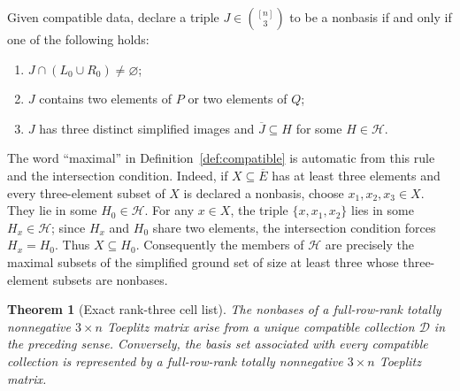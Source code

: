 \documentclass{amsart}
\numberwithin{equation}{section}
\newtheorem{theorem}{Theorem}
\theoremstyle{definition}
\theoremstyle{remark}
\begin{document}
Given compatible data, declare a triple $J\in\binom{[n]}3$ to be a nonbasis if and only if one of the following holds:
\begin{enumerate}
\item $J\cap(L_0\cup R_0)\ne\varnothing$;
\item $J$ contains two elements of $P$ or two elements of $Q$;
\item $J$ has three distinct simplified images and $\overline J\subseteq H$ for some $H\in\mathcal H$.
\end{enumerate}
The word ``maximal'' in Definition~\ref{def:compatible} is automatic from this rule and the intersection condition.  Indeed, if $X\subseteq\overline E$ has at least three elements and every three-element subset of $X$ is declared a nonbasis, choose $x_1,x_2,x_3\in X$.  They lie in some $H_0\in\mathcal H$.  For any $x\in X$, the triple $\{x,x_1,x_2\}$ lies in some $H_x\in\mathcal H$; since $H_x$ and $H_0$ share two elements, the intersection condition forces $H_x=H_0$.  Thus $X\subseteq H_0$.  Consequently the members of $\mathcal H$ are precisely the maximal subsets of the simplified ground set of size at least three whose three-element subsets are nonbases.

\begin{theorem}[Exact rank-three cell list]\label{thm:rank3-list}
The nonbases of a full-row-rank totally nonnegative $3\times n$ Toeplitz matrix arise from a unique compatible collection $\mathcal D$ in the preceding sense.  Conversely, the basis set associated with every compatible collection is represented by a full-row-rank totally nonnegative $3\times n$ Toeplitz matrix.
\end{theorem}
\end{document}

